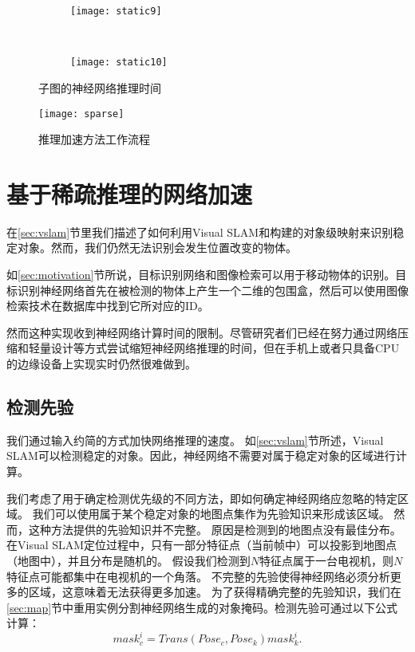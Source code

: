 \begin{figure}[t]
	\centering
	\begin{subfigure}{.48\linewidth}
		\texttt{[image: static9]}
		\caption{}
	\end{subfigure}
	\ 
	\begin{subfigure}{.48\linewidth}
		\texttt{[image: static10]}
		\caption{}
	\end{subfigure}
	\caption{子图的神经网络推理时间}\label{fig:subframetime}
\end{figure}


\begin{figure}[t]
	\centering
	\texttt{[image: sparse]}
	\caption{推理加速方法工作流程}
	\label{fig:sparse-conv}
\end{figure}


\section{基于稀疏推理的网络加速}\label{sub:Sparse Object Detection}
在\ref{sec:vslam}节里我们描述了如何利用Visual SLAM和构建的对象级映射来识别稳定对象。然而，我们仍然无法识别会发生位置改变的物体。

如\ref{sec:motivation}节所说，目标识别网络和图像检索可以用于移动物体的识别。目标识别神经网络首先在被检测的物体上产生一个二维的包围盒，然后可以使用图像检索技术在数据库中找到它所对应的ID。

然而这种实现收到神经网络计算时间的限制。尽管研究者们已经在努力通过网络压缩和轻量设计等方式尝试缩短神经网络推理的时间，但在手机上或者只具备CPU的边缘设备上实现实时仍然很难做到。


\subsection{检测先验}

我们通过输入约简的方式加快网络推理的速度。
如\ref{sec:vslam}节所述，Visual SLAM可以检测稳定的对象。因此，神经网络不需要对属于稳定对象的区域进行计算。

我们考虑了用于确定检测优先级的不同方法，即如何确定神经网络应忽略的特定区域。
我们可以使用属于某个稳定对象的地图点集作为先验知识来形成该区域。
然而，这种方法提供的先验知识并不完整。
原因是检测到的地图点没有最佳分布。
在Visual SLAM定位过程中，只有一部分特征点（当前帧中）可以投影到地图点（地图中），并且分布是随机的。
假设我们检测到$N$特征点属于一台电视机，则$N$特征点可能都集中在电视机的一个角落。
不完整的先验使得神经网络必须分析更多的区域，这意味着无法获得更多加速。
为了获得精确完整的先验知识，我们在\ref{sec:map}节中重用实例分割神经网络生成的对象掩码。检测先验可通过以下公式计算：
\begin{equation}\label{equ:mask}
mask_c^i = Trans(Pose_c,Pose_k)mask_k^i.
\end{equation} 

